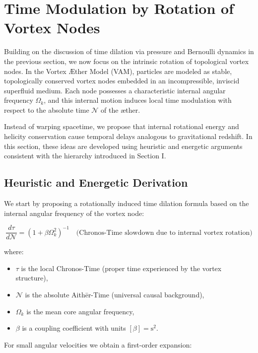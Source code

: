 \section{Time Modulation by Rotation of Vortex Nodes}

Building on the discussion of time dilation via pressure and Bernoulli dynamics in the previous section, we now focus on the intrinsic rotation of topological vortex nodes. In the Vortex Æther Model (VAM), particles are modeled as stable, topologically conserved vortex nodes embedded in an incompressible, inviscid superfluid medium. Each node possesses a characteristic internal angular frequency $\Omega_k$, and this internal motion induces local time modulation with respect to the absolute time $\mathcal{N}$ of the æther.

Instead of warping spacetime, we propose that internal rotational energy and helicity conservation cause temporal delays analogous to gravitational redshift. In this section, these ideas are developed using heuristic and energetic arguments consistent with the hierarchy introduced in Section I.

\subsection{Heuristic and Energetic Derivation}

We start by proposing a rotationally induced time dilation formula based on the internal angular frequency of the vortex node:

\begin{equation}
    \frac{d\tau}{d\mathcal{N}} = \left(1 + \beta \Omega_k^2 \right)^{-1}
    \quad \text{(Chronos-Time slowdown due to internal vortex rotation)}
    \label{eq:chronos_swirl_slowdown}
\end{equation}

where:

\begin{itemize}
    \item $\tau$ is the local Chronos-Time (proper time experienced by the vortex structure),
    \item $\mathcal{N}$ is the absolute Aithēr-Time (universal causal background),
    \item $\Omega_k$ is the mean core angular frequency,
    \item $\beta$ is a coupling coefficient with units $[\beta] = \mathrm{s}^2$.
\end{itemize}

For small angular velocities we obtain a first-order expansion:

